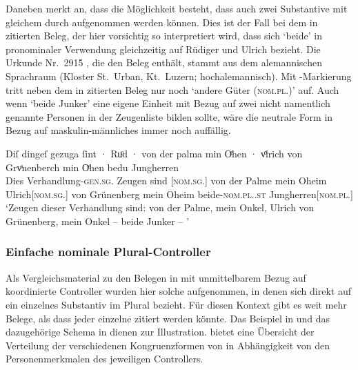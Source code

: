 \label{phsec:jungherren}
Daneben merkt \citet[384]{paul2007} an, dass die Möglichkeit besteht, dass auch
zwei Substantive mit gleichem  durch  aufgenommen
werden können. Dies ist der Fall bei dem in 
zitierten Beleg, der hier vorsichtig so interpretiert wird, dass sich
 `beide' in pronominaler Verwendung gleichzeitig auf Rüdiger und
Ulrich bezieht. Die Urkunde Nr.~2915 \autocite[213,14--42]{cao4}, die den Beleg
enthält, stammt aus dem alemannischen
Sprachraum (Kloster St.~Urban, Kt.~Luzern;
hochalemannisch). Mit -Markierung tritt neben dem in
 zitierten Beleg nur noch  `andere
Güter (\textsc{nom.pl.\NeutI})' \autocites(Nr.~2915)[213.27]{cao4} auf. Auch
wenn  `beide Junker' eine eigene Einheit mit Bezug auf
zwei nicht namentlich genannte Personen in der Zeugenliste bilden sollte, wäre
die neutrale Form  in Bezug auf maskulin-männliches 
immer noch auffällig.

\begin{exe}
\ex \label{ex:beid2coordncao1_2}
	\gll Diſ dingeſ gezuga ſint · Ruͦd · von der palma
			min Oͤhen · vͦlrich von Grvͤnenberch min Oͤhen bedu Jungherren \\
		Dies Verhandlung-\textsc{gen.sg.\NeutI} Zeugen sind {}
		[\textsc{nom.sg.\MascM}] {} von der Palme mein Oheim {}
		Ulrich[\textsc{nom.sg.\MascM}] von Grünenberg mein Oheim
		beide-\textsc{nom.pl.\NeutM.st} Jungherren[\textsc{nom.pl.\MascM}] \\
	\trans `Zeugen dieser Verhandlung sind:  von der Palme,
		mein Onkel, Ulrich von Grünenberg, mein Onkel -- beide Junker --
		\textelp{}'
			\parencites(Nr.~2915, Kl.~St.~Urban, Kt.~Luzern, 1298)[213,33--35]{cao4}
\end{exe}

\subsubsection{Einfache nominale Plural-Controller}
\label{subsubsec:persplnp}

Als Vergleichsmaterial zu den Belegen in  mit
unmittelbarem Bezug auf koordinierte Controller wurden hier solche aufgenommen,
in denen sich  direkt auf ein einzelnes Substantiv im Plural
bezieht. Für diesen Kontext gibt es weit mehr Belege, als dass jeder einzelne
zitiert werden könnte. Das Beispiel in  und das
dazugehörige Schema in  dienen zur Illustration.
 bietet eine Übersicht der
Verteilung der verschiedenen Kongruenz\-formen
von  in Abhängigkeit von den Personenmerkmalen des jeweiligen
Controllers.

